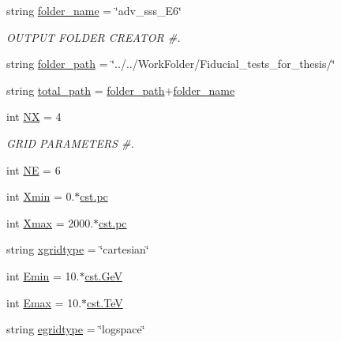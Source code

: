\begin{DoxyCompactItemize}
\item 
string \hyperlink{namespacenamelist__advst_aed61e4f60a73b3b17c11d94f03046285}{folder\+\_\+name} = \char`\"{}adv\+\_\+sss\+\_\+\+E6\char`\"{}
\begin{DoxyCompactList}\small\item\em O\+U\+T\+P\+UT F\+O\+L\+D\+ER C\+R\+E\+A\+T\+OR \#. \end{DoxyCompactList}\item 
string \hyperlink{namespacenamelist__advst_ac4af9d0b4fb1c8e072a43b5ee91eb5e5}{folder\+\_\+path} = \char`\"{}../../Work\+Folder/Fiducial\+\_\+tests\+\_\+for\+\_\+thesis/\char`\"{}
\item 
string \hyperlink{namespacenamelist__advst_a1dc66bff49add10796a03a886be932e1}{total\+\_\+path} = \hyperlink{namespacenamelist__advst_ac4af9d0b4fb1c8e072a43b5ee91eb5e5}{folder\+\_\+path}+\hyperlink{namespacenamelist__advst_aed61e4f60a73b3b17c11d94f03046285}{folder\+\_\+name}
\item 
int \hyperlink{namespacenamelist__advst_aa1b80e565bfbbce10c881f22578f0133}{NX} = 4
\begin{DoxyCompactList}\small\item\em G\+R\+ID P\+A\+R\+A\+M\+E\+T\+E\+RS \#. \end{DoxyCompactList}\item 
int \hyperlink{namespacenamelist__advst_a8b68b8da1c4d80c1ef5c6626a823ce9c}{NE} = 6
\item 
int \hyperlink{namespacenamelist__advst_a6d9186a3779059c135060e63cd560845}{Xmin} = 0.$\ast$\hyperlink{constants_8h_a2884cd030c4c825754349a525a1d06ce}{cst.\+pc}
\item 
int \hyperlink{namespacenamelist__advst_a454de5ba953a2b423c001eb8b77fb0dc}{Xmax} = 2000.$\ast$\hyperlink{constants_8h_a2884cd030c4c825754349a525a1d06ce}{cst.\+pc}
\item 
string \hyperlink{namespacenamelist__advst_a4949957746aba42b8d0c598a4b3d0c85}{xgridtype} = \char`\"{}cartesian\char`\"{}
\item 
int \hyperlink{namespacenamelist__advst_a97440da92df5821ce14a86acea734b66}{Emin} = 10.$\ast$\hyperlink{constants_8h_aec0e126d9991db8ad0b26139f5860568}{cst.\+GeV}
\item 
int \hyperlink{namespacenamelist__advst_a75a0a963cc39172d328e2081f41070a5}{Emax} = 10.$\ast$\hyperlink{constants_8h_a7f801e1f6821bc6baf0652ed2496e5e9}{cst.\+TeV}
\item 
string \hyperlink{namespacenamelist__advst_acc8c3315bfe1fcf3196b024927d931c9}{egridtype} = \char`\"{}logspace\char`\"{}

\end{DoxyCompactItemize}

